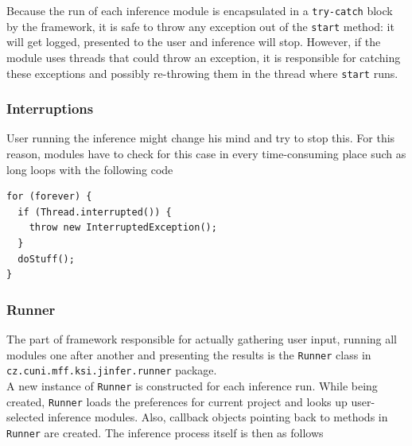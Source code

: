 \documentclass[a4paper,10pt,oneside]{article}
\newcommand{\code}[1]{\texttt{#1}}
\begin{document}
Because the run of each inference module is encapsulated in a \code{try-catch} block by the framework, it is safe to throw any exception out of the \code{start} method: it will get logged, presented to the user and inference will stop. However, if the module uses threads that could throw an exception, it is responsible for catching these exceptions and possibly re-throwing them in the thread where \code{start} runs.

\subsubsection{Interruptions}

User running the inference might change his mind and try to stop this. For this reason, modules have to check for this case in every time-consuming place such as long loops with the following code
\begin{verbatim}
for (forever) {
  if (Thread.interrupted()) {
    throw new InterruptedException();
  }
  doStuff();
}
\end{verbatim}

\subsubsection{Runner}

The part of framework responsible for actually gathering user input, running all modules one after another and presenting the results is the \code{Runner} class  in \code{cz.cuni.mff.ksi.jinfer.runner} package.\\

A new instance of \code{Runner} is constructed for each inference run. While being created, \code{Runner}  loads the preferences for current project and looks up user-selected inference modules. Also, callback objects pointing back to methods in \code{Runner} are created. The inference process itself is then as follows
\end{document}
